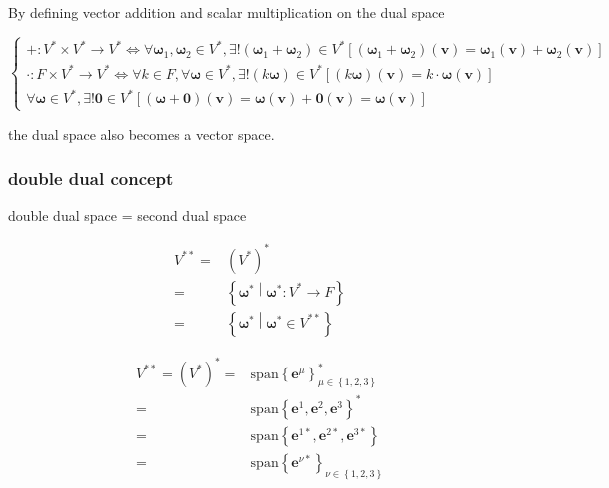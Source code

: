 \documentclass[
]{book}
\theoremstyle{definition}
\theoremstyle{definition}
\theoremstyle{definition}
\theoremstyle{definition}
\theoremstyle{remark}
\begin{document}
By defining vector addition and scalar multiplication on the dual space

\[
\begin{cases}
+:V^{*}\times V^{*}\rightarrow V^{*}\Leftrightarrow\forall\boldsymbol{\omega}_{{\scriptscriptstyle 1}},\boldsymbol{\omega}_{{\scriptscriptstyle 2}}\in V^{*},\exists!\left(\boldsymbol{\omega}_{{\scriptscriptstyle 1}}+\boldsymbol{\omega}_{{\scriptscriptstyle 2}}\right)\in V^{*}\left[\left(\boldsymbol{\omega}_{{\scriptscriptstyle 1}}+\boldsymbol{\omega}_{{\scriptscriptstyle 2}}\right)\left(\boldsymbol{v}\right)=\boldsymbol{\omega}_{{\scriptscriptstyle 1}}\left(\boldsymbol{v}\right)+\boldsymbol{\omega}_{{\scriptscriptstyle 2}}\left(\boldsymbol{v}\right)\right]\\
\cdot:F\times V^{*}\rightarrow V^{*}\Leftrightarrow\forall k\in F,\forall\boldsymbol{\omega}\in V^{*},\exists!\left(k\boldsymbol{\omega}\right)\in V^{*}\left[\left(k\boldsymbol{\omega}\right)\left(\boldsymbol{v}\right)=k\cdot\boldsymbol{\omega}\left(\boldsymbol{v}\right)\right]\\
\forall\boldsymbol{\omega}\in V^{*},\exists!\boldsymbol{0}\in V^{*}\left[\left(\boldsymbol{\omega}+\boldsymbol{0}\right)\left(\boldsymbol{v}\right)=\boldsymbol{\omega}\left(\boldsymbol{v}\right)+\boldsymbol{0}\left(\boldsymbol{v}\right)=\boldsymbol{\omega}\left(\boldsymbol{v}\right)\right]
\end{cases}
\]

the dual space also becomes a vector space.

\subsubsection{double dual concept}\label{double-dual-concept}

double dual space = second dual space

\[
\begin{aligned}
V^{**}= & \left(V^{*}\right)^{*}\\
= & \left\{ \boldsymbol{\omega}^{*}\middle|\boldsymbol{\omega}^{*}:V^{*}\rightarrow F\right\} \\
= & \left\{ \boldsymbol{\omega}^{*}\middle|\boldsymbol{\omega}^{*}\in V^{**}\right\} 
\end{aligned}
\]

\[
\begin{aligned}
V^{**}=\left(V^{*}\right)^{*}= & \mathrm{span}\left\{ \boldsymbol{e}^{{\scriptscriptstyle \mu}}\right\} _{{\scriptscriptstyle \mu\in\left\{ 1,2,3\right\} }}^{*}\\
= & \mathrm{span}\left\{ \boldsymbol{e}^{{\scriptscriptstyle 1}},\boldsymbol{e}^{{\scriptscriptstyle 2}},\boldsymbol{e}^{{\scriptscriptstyle 3}}\right\} ^{*}\\
= & \mathrm{span}\left\{ \boldsymbol{e}^{{\scriptscriptstyle 1}*},\boldsymbol{e}^{{\scriptscriptstyle 2}*},\boldsymbol{e}^{{\scriptscriptstyle 3}*}\right\} \\
= & \mathrm{span}\left\{ \boldsymbol{e}^{{\scriptscriptstyle \nu}*}\right\} _{{\scriptscriptstyle \nu\in\left\{ 1,2,3\right\} }}
\end{aligned}
\]
\end{document}
